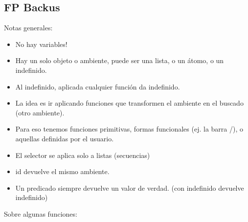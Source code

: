 \subsection{FP Backus}

Notas generales:
\begin{itemize}
\item No hay variables!
\item Hay un solo objeto o ambiente, puede ser una lista, o un átomo, o un indefinido.
\item Al indefinido, aplicada cualquier función da indefinido.
\item La idea es ir aplicando funciones que transformen el ambiente en el buscado (otro ambiente).
\item Para eso tenemos funciones primitivas, formas funcionales (ej. la barra /), o aquellas definidas por el usuario.
\item El selector se aplica solo a listas (secuencias)
\item id devuelve el mismo ambiente.
\item Un predicado siempre devuelve un valor de verdad. (con indefinido devuelve indefinido)
\end{itemize}

Sobre algunas funciones:


